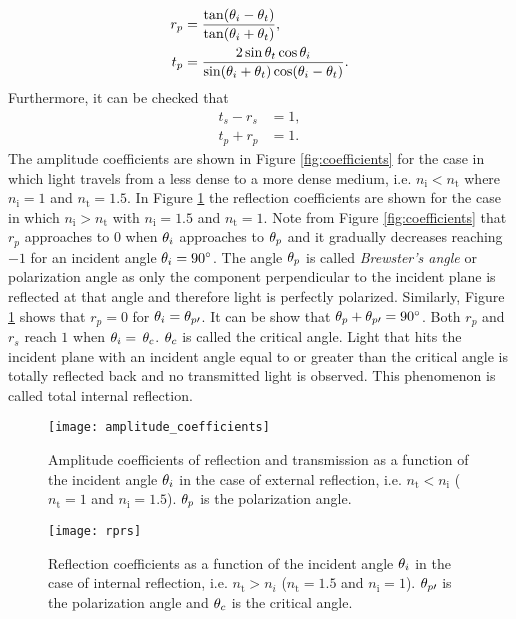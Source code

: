 \begin{equation} \label{simple_Fresnel}
\begin{split}
r_{p} & =  \frac{\tan(\theta_i-\theta_t)}{\tan(\theta_i+\theta_t)},\\
t_{p} & = \frac{2\sin \theta_t \cos \theta_i}{\sin(\theta_i+\theta_t)\cos(\theta_i- \theta_t)}.
\end{split}
\end{equation}
Furthermore, it can be checked that
 \begin{equation}
\begin{split}
t_s-r_s &= 1, \\
t_p+r_p &=  1.
\end{split}
\end{equation}
The amplitude coefficients are shown in Figure \ref{fig:coefficients} for the case in which light travels from a less dense to a more dense medium, i.e. $n_\textrm{i}<n_\textrm{t}$ where $n_{\textrm{i}}= 1$ and $n_{\textrm{t}}=1.5$. 
In Figure \ref{fig:coefficients2} the reflection coefficients are shown for the case in which $n_\textrm{i}>n_\textrm{t}$ with $n_{\textrm{i}}= 1.5$ and $n_{\textrm{t}}=1$. Note from Figure \ref{fig:coefficients} that $r_p$ approaches to $0$ when $\theta_i$ approaches to $\theta_p$ and it gradually decreases reaching $-1$ for an incident angle $\theta_i=90^\circ$. The angle $\theta_p$ is called \textit{Brewster's angle} or polarization angle as only the component perpendicular to the incident plane is reflected at that angle and therefore light is perfectly polarized. Similarly, Figure \ref{fig:coefficients2} shows that $r_p=0$ for $\theta_i= \theta_{p\prime}$. It can be show that $\theta_p+ \theta_{p\prime}= 90^\circ$. Both $r_p$ and $r_s$ reach $1$ when $\theta_i= $ $\theta_c$. $\theta_c$ is called the critical angle. Light that hits the incident plane with an incident angle equal to or greater than the critical angle is totally reflected back and no transmitted light is observed. This phenomenon is called total internal reflection. 
\begin{figure}[h]
  \begin{minipage}[h]{0.4\textwidth}
    \texttt{[image: amplitude\_coefficients]}
    \caption{Amplitude coefficients of reflection and transmission as a function of the incident angle $\theta_i$  in the case of external reflection, i.e. $n_\textrm{t}<n_\textrm{i}$
($n_\textrm{t} = 1$ and $n_\textrm{i}=1.5$). $\theta_p$ is the polarization angle.}
    \label{fig:coefficients}
  \end{minipage} \hspace{2.5cm}
  \begin{minipage}[h]{0.4\textwidth}
    \texttt{[image: rprs]}
    \caption{Reflection coefficients as a function of the incident angle $\theta_i$ in the case of internal reflection, i.e. $n_\textrm{t}>n_i$
($n_\textrm{t} = 1.5$ and $n_\textrm{i}=1$). $\theta_{p\prime}$ is the polarization angle and $\theta_c$ is the critical angle.}
   \label{fig:coefficients2}
 \end{minipage}
\end{figure}\\
